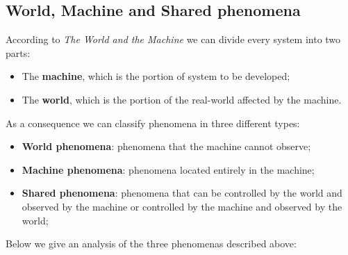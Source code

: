 \documentclass[../RASD.tex]{subfiles}
\begin{document}
    \subsection{World, Machine and Shared phenomena}\label{subsec:world,-machine-and-shared-phenomena}
    According to \textit{The World and the Machine} we can divide every system into two parts:
    \begin{itemize}
        \item The \textbf{machine}, which is the portion of system to be developed;
        \item The \textbf{world}, which is the portion of the real-world affected by the machine.
    \end{itemize}
    As a consequence we can classify phenomena in three different types:
    \begin{itemize}
        \item \textbf{World phenomena}: phenomena that the machine cannot observe;
        \item \textbf{Machine phenomena}: phenomena located entirely in the machine;
        \item \textbf{Shared phenomena}: phenomena that can be controlled by the world and observed by the machine or controlled by the machine and observed by the world;
    \end{itemize}
    Below we give an analysis of the three phenomenas described above:
\end{document}
